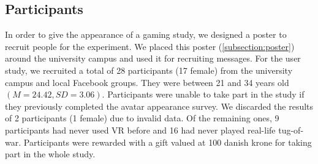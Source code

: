 \subsection{Participants}
\label{subsection:participantsExperiment}
In order to give the appearance of a gaming study, we designed a poster to recruit people for the experiment. We placed this poster (\ref{subsection:poster}) around the university campus and  used it for recruiting messages. For the user study, we recruited a total of 28 participants (17 female) from the university campus and local Facebook groups. They were between 21 and 34 years old $(M = 24.42, SD = 3.06)$. Participants were unable to take part in the study if they previously completed the avatar appearance survey. We discarded the results of 2 participants (1 female) due to invalid data. Of the remaining ones, 9 participants had never used VR before and 16 had never played real-life tug-of-war. Participants were rewarded with a gift valued at 100 danish krone for taking part in the whole study.

